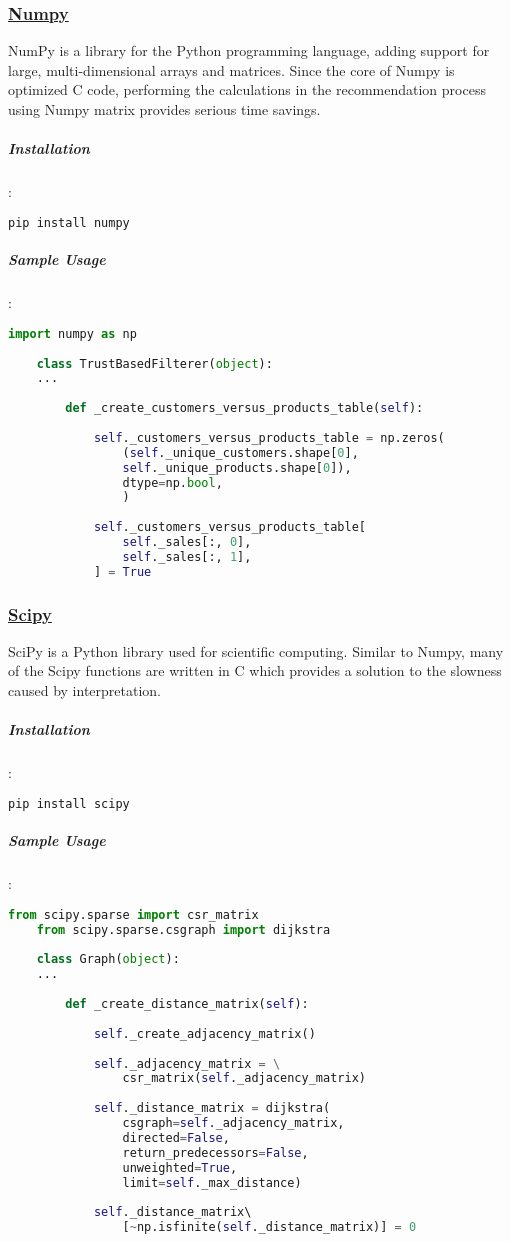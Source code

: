 	\subsubsection{\href{https://numpy.org/}{Numpy}}
	NumPy is a library for the Python programming language, adding support for large, multi-dimensional arrays and matrices. Since the core of Numpy is optimized C code, performing the calculations in the recommendation process using Numpy matrix provides serious time savings.
	\subparagraph{Installation}:
	\begin{lstlisting}[language=bash]
	pip install numpy
	\end{lstlisting}
	
	\subparagraph{Sample Usage}:
	\begin{lstlisting}[language=python, caption=Numpy example]
	import numpy as np
	
	class TrustBasedFilterer(object):
	...
	
		def _create_customers_versus_products_table(self):
	
			self._customers_versus_products_table = np.zeros(
				(self._unique_customers.shape[0],
				self._unique_products.shape[0]),
				dtype=np.bool,
				)
	
			self._customers_versus_products_table[
				self._sales[:, 0],
				self._sales[:, 1],
			] = True
	\end{lstlisting}
	
	\subsubsection{\href{https://www.scipy.org/}{Scipy}}
	SciPy is a Python library used for scientific computing. Similar to Numpy, many of the Scipy functions are written in C which provides a solution to the slowness caused by interpretation.
	\subparagraph{Installation}:
	\begin{lstlisting}[language=bash]
	pip install scipy
	\end{lstlisting}
	
	\subparagraph{Sample Usage}:
	\begin{lstlisting}[language=python, caption=Scipy example]
	from scipy.sparse import csr_matrix
	from scipy.sparse.csgraph import dijkstra
	
	class Graph(object):
	...
	
		def _create_distance_matrix(self):
	
			self._create_adjacency_matrix()
	
			self._adjacency_matrix = \
				csr_matrix(self._adjacency_matrix)
	
			self._distance_matrix = dijkstra( 
				csgraph=self._adjacency_matrix, 
				directed=False, 
				return_predecessors=False, 
				unweighted=True,
				limit=self._max_distance)
	
			self._distance_matrix\ 
				[~np.isfinite(self._distance_matrix)] = 0
	\end{lstlisting}
